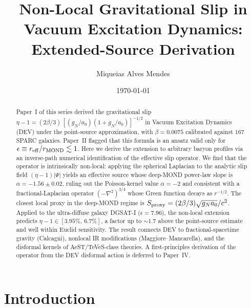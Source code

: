 \documentclass[aps,prd,twocolumn,superscriptaddress,nofootinbib]{revtex4-2}
\newcommand{\aO}{a_0}
\begin{document}
\title{Non-Local Gravitational Slip in Vacuum Excitation Dynamics:
       Extended-Source Derivation}

\author{Miqueias Alves Mendes}

\date{\today}

\begin{abstract}
Paper~I of this series derived the gravitational slip
$\eta - 1 = (2\beta/3)\,[(g_N/\aO)(1+g_N/\aO)]^{-1/2}$ in
Vacuum Excitation Dynamics (DEV) under the point-source
approximation, with $\beta = 0.0075$ calibrated against
$167$ SPARC galaxies. Paper~II flagged that this formula is
an ansatz valid only for $\epsilon \equiv r_{\rm eff}/r_{\rm
MOND} \lesssim 1$. Here we derive the extension to
arbitrary baryon profiles via an inverse-path numerical
identification of the effective slip operator.
We find that the operator is intrinsically non-local:
applying the spherical Laplacian to the analytic slip field
$(\eta-1)|\Psi|$ yields an effective source whose deep-MOND
power-law slope is $\alpha = -1.56\pm 0.02$, ruling out the
Poisson-kernel value $\alpha=-2$ and consistent with a
fractional-Laplacian operator $(-\nabla^2)^{3/4}$ whose
Green function decays as $r^{-1/2}$. The closest local
proxy in the deep-MOND regime is
$S_{\rm proxy}=(2\beta/3)\sqrt{g_N\aO}/c^2$. Applied to
the ultra-diffuse galaxy DGSAT-I ($\epsilon=7.96$), the
non-local extension predicts $\eta-1 \in [3.95\%,\,6.7\%]$,
a factor up to $\sim\!1.7$ above the point-source estimate
and well within Euclid sensitivity. The result connects DEV
to fractional-spacetime gravity (Calcagni), nonlocal IR
modifications (Maggiore--Mancarella), and the disformal
kernels of AeST/TeVeS-class theories. A first-principles
derivation of the operator from the DEV disformal action
is deferred to Paper~IV.
\end{abstract}

\maketitle

\section{Introduction}
\label{sec:intro}
\end{document}
